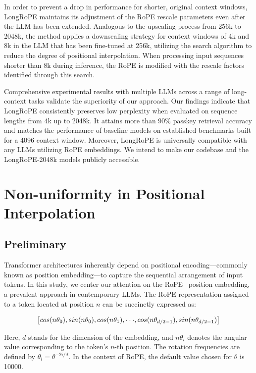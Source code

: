 In order to prevent a drop in performance for shorter, original context windows, {LongRoPE} maintains its adjustment of the RoPE rescale parameters even after the LLM has been extended. Analogous to the upscaling process from 256k to 2048k, the method applies a downscaling strategy for context windows of 4k and 8k in the LLM that has been fine-tuned at 256k, utilizing the search algorithm to reduce the degree of positional interpolation. When processing input sequences shorter than 8k during inference, the RoPE is modified with the rescale factors identified through this search.

Comprehensive experimental results with multiple LLMs across a range of long-context tasks validate the superiority of our approach. Our findings indicate that LongRoPE consistently preserves low perplexity when evaluated on sequence lengths from 4k up to 2048k. It attains more than 90\% passkey retrieval accuracy and matches the performance of baseline models on established benchmarks built for a 4096 context window. Moreover, LongRoPE is universally compatible with any LLMs utilizing RoPE embeddings. We intend to make our codebase and the LongRoPE-2048k models publicly accessible.

\section{Non-uniformity in Positional Interpolation}
\label{sec:analysis}

\subsection{Preliminary}

Transformer architectures inherently depend on positional encoding—commonly known as position embedding—to capture the sequential arrangement of input tokens. In this study, we center our attention on the RoPE~\cite{rope} position embedding, a prevalent approach in contemporary LLMs. The RoPE representation assigned to a token located at position $n$ can be succinctly expressed as:

\begin{equation}
	\fontsize{7.8}{7.8} \selectfont
	\label{eq:rope}
	\left[ cos(n\theta_0), sin(n\theta_0), cos(n\theta_1), \cdot\cdot\cdot, cos(n\theta_{d/2-1}), sin(n\theta_{d/2-1}) \right]   
\end{equation}

Here, $d$ stands for the dimension of the embedding, and $n\theta_i$ denotes the angular value corresponding to the token’s $n$-th position. The rotation frequencies are defined by $\theta_i = \theta^{-2i/d}$. In the context of RoPE, the default value chosen for $\theta$ is 10000.

